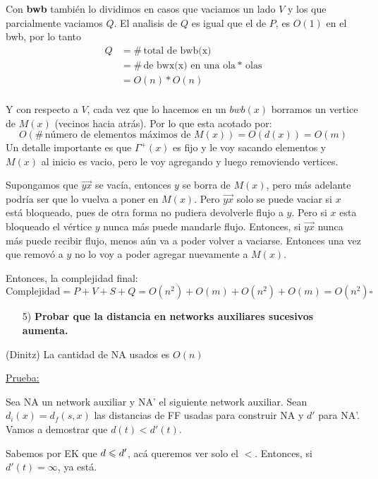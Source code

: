 \documentclass[12pt,a4paper]{article}
\begin{document}
Con \textbf{bwb} también lo dividimos en casos que vaciamos un lado $V$ y 
los que parcialmente vaciamos $Q$. El analisis de $Q$ es igual que el de $P$, es 
$O(1)$ en el bwb, por lo tanto
\begin{align*}
    Q &= \#\,\text{total de bwb(x)}\\
    &= \#\,\text{de bwx(x) en una ola} * \,\text{olas}\\
    &= O(n) * O(n)\\
\end{align*}

Y con respecto a $V$, cada vez que lo hacemos en un $bwb(x)$ borramos un 
vertice de $M(x)$ (vecinos hacia atrás). Por lo que esta acotado por:
$$O(\#\,\text{número de elementos máximos de $M(x)$}) = O(d(x)) = O(m)$$
Un detalle importante es que $\Gamma^{+}(x)$ es fijo y le voy sacando elementos y 
$M(x)$ al inicio es vacio, pero le voy agregando y luego removiendo vertices.
\medskip

Supongamos que $\overrightarrow{yx}$ se vacía, entonces $y$ se borra de $M(x)$,
pero más adelante podría ser que lo vuelva a poner en $M(x)$. Pero 
$\overrightarrow{yx}$ solo se puede vaciar si $x$ está bloqueado, pues de otra 
forma no pudiera devolverle flujo a $y$. Pero si $x$ esta bloqueado el 
vértice $y$ nunca más puede mandarle flujo. Entonces, si $\overrightarrow{yx}$ 
nunca más puede recibir flujo, menos aún va a poder volver a vaciarse. Entonces 
una vez que removó a $y$ no lo voy a poder agregar nuevamente a $M(x)$.
\medskip

Entonces, la complejidad final:
$$\text{Complejidad} = P + V + S + Q = O(n^{2}) + O(m) + O(n^{2}) + O(m) = O(n^{2}) \square$$

\begin{itemize}
    \item [5)] \textbf{Probar que la distancia en networks auxiliares sucesivos aumenta.}
    \label{dem:dist2}
\end{itemize}

\begin{teorema} (Dinitz) La cantidad de NA usados es $O(n)$
\end{teorema}
\underline{Prueba:}
\medskip

Sea NA un network auxiliar y NA' el siguiente network auxiliar. Sean $d_{i}(x) = d_{f}(s,x)$ 
las distancias de FF usadas para construir NA y $d'$ para NA'. Vamos a demostrar 
que $d(t) < d'(t)$.
\medskip

Sabemos por EK que $d \leqslant d'$, acá queremos ver solo el $<$. Entonces, si 
$d'(t) = \infty$, ya está.
\medskip
\end{document}
